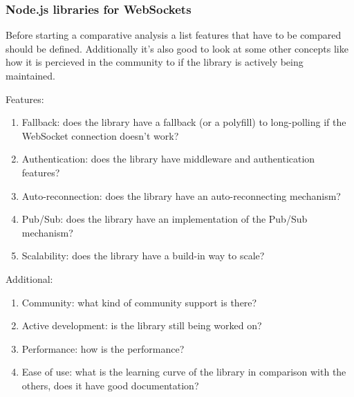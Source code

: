 \subsubsection{Node.js libraries for WebSockets}

Before starting a comparative analysis a list  features that have to be compared should be defined. Additionally it's also good to look at some other concepts like how it is percieved in the community to if the library is actively being maintained.

Features:

\begin{enumerate}
  \item Fallback: does the library have a fallback (or a polyfill) to long-polling if the WebSocket connection doesn't work?
  \item Authentication: does the library have middleware and authentication features?
  \item Auto-reconnection: does the library have an auto-reconnecting mechanism?
  \item Pub/Sub: does the library have an implementation of the Pub/Sub mechanism?
  \item Scalability: does the library have a build-in way to scale?
\end{enumerate}

Additional:

\begin{enumerate}
  \item Community: what kind of community support is there?
  \item Active development: is the library still being worked on?
  \item Performance: how is the performance?
  \item Ease of use: what is the learning curve of the library in comparison with the others, does it have good documentation?
\end{enumerate}

